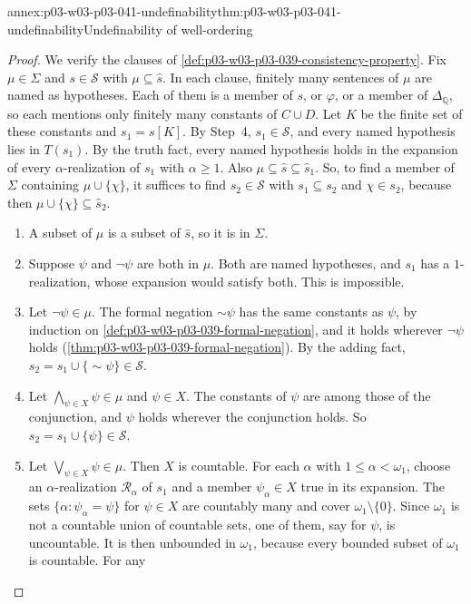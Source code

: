 \begin{annexitem}{annex:p03-w03-p03-041-undefinability}{thm:p03-w03-p03-041-undefinability}{Undefinability of well-ordering}
\begin{proof}
We verify the clauses of \cref{def:p03-w03-p03-039-consistency-property}.
Fix \(\mu\in\Sigma\) and \(s\in\mathcal S\) with \(\mu\subseteq\hat s\).
In each clause, finitely many sentences of \(\mu\) are named as
hypotheses. Each of them is a member of \(s\), or \(\varphi\), or a member
of \(\Delta_{\mathbb Q}\), so each mentions only finitely many constants
of \(C\cup D\). Let \(K\) be the finite set of these constants and
\(s_1=s[K]\). By Step~4, \(s_1\in\mathcal S\), and every named hypothesis
lies in \(T(s_1)\). By the truth fact, every named hypothesis holds in the
expansion of every \(\alpha\)-realization of \(s_1\) with
\(\alpha\geq1\). Also \(\mu\subseteq\hat s\subseteq\hat s_1\). So, to find
a member of \(\Sigma\) containing \(\mu\cup\{\chi\}\), it suffices to
find \(s_2\in\mathcal S\) with \(s_1\subseteq s_2\) and \(\chi\in s_2\),
because then \(\mu\cup\{\chi\}\subseteq\hat s_2\).
\begin{enumerate}
\item[C0] A subset of \(\mu\) is a subset of \(\hat s\), so it is in
      \(\Sigma\).
\item[C1] Suppose \(\psi\) and \(\neg\psi\) are both in \(\mu\). Both are
      named hypotheses, and \(s_1\) has a \(1\)-realization, whose
      expansion would satisfy both. This is impossible.
\item[C2] Let \(\neg\psi\in\mu\). The formal negation \({\sim}\psi\)
      has the same constants as \(\psi\), by induction on
      \cref{def:p03-w03-p03-039-formal-negation}, and it holds wherever
      \(\neg\psi\) holds (\cref{thm:p03-w03-p03-039-formal-negation}). By
      the adding fact, \(s_2=s_1\cup\{{\sim}\psi\}\in\mathcal S\).
\item[C3] Let \(\bigwedge_{\psi\in X}\psi\in\mu\) and \(\psi\in X\). The
      constants of \(\psi\) are among those of the conjunction, and
      \(\psi\) holds wherever the conjunction holds. So
      \(s_2=s_1\cup\{\psi\}\in\mathcal S\).
\item[C4] Let \(\bigvee_{\psi\in X}\psi\in\mu\). Then \(X\) is countable.
      For each \(\alpha\) with \(1\leq\alpha<\omega_1\), choose an
      \(\alpha\)-realization \(\mathcal R_\alpha\) of \(s_1\) and a member
      \(\psi_\alpha\in X\) true in its expansion. The sets
      \(\{\alpha:\psi_\alpha=\psi\}\) for \(\psi\in X\) are countably many
      and cover \(\omega_1\setminus\{0\}\). Since \(\omega_1\) is not a
      countable union of countable sets, one of them, say for \(\psi\), is
      uncountable. It is then unbounded in \(\omega_1\), because every
      bounded subset of \(\omega_1\) is countable. For any

\end{enumerate}
\end{proof}
\end{annexitem}
